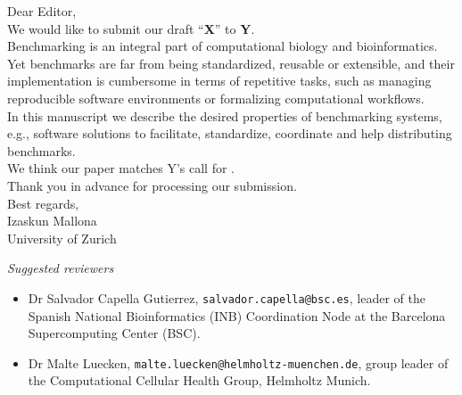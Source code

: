 \documentclass[a4paper]{article}
\newcommand{\submission}{X}
\newcommand{\journal}{Y}
\begin{document}
\noindent Dear Editor,\\

We would like to submit our draft ``\textbf{\submission}'' to \textbf{\journal}.\\

Benchmarking is an integral part of computational biology and bioinformatics. Yet benchmarks are far from being standardized, reusable or extensible, and their implementation is cumbersome in terms of repetitive tasks, such as managing reproducible software environments or formalizing computational workflows.\\ 

In this manuscript we describe the desired properties of benchmarking systems, e.g., software solutions to facilitate, standardize, coordinate and help distributing benchmarks.\\

We think our paper matches \journal's call for .\\

Thank you in advance for processing our submission. \\

Best regards,\\

Izaskun Mallona\\
\indent University of Zurich\\

\vspace{1cm}

\textit{Suggested reviewers}

\begin{itemize}
    \item Dr Salvador Capella Gutierrez, \texttt{salvador.capella@bsc.es}, leader of the Spanish National Bioinformatics (INB) Coordination Node at the Barcelona Supercomputing Center (BSC).
    \item Dr Malte Luecken, \texttt{malte.luecken@helmholtz-muenchen.de}, group leader of the Computational Cellular Health Group, Helmholtz Munich.
\end{itemize}
\end{document}

